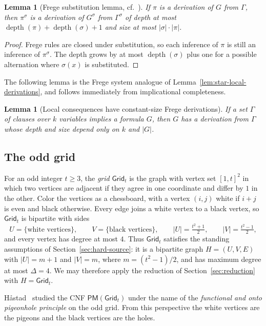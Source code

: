\documentclass[11pt]{article}
\newtheorem{lemma}[theorem]{Lemma}
\theoremstyle{definition}
\theoremstyle{remark}
\newcommand{\PM}{\mathsf{PM}}
\newcommand{\Grid}{\mathsf{Grid}}
\begin{document}
\begin{lemma}[{Frege substitution lemma, cf.~\cite[Lemma~2.5]{cook-reckhow}}]
\label{lem:frege-substitution}
If $\pi$ is a derivation of $G$ from $\Gamma$, then $\pi^\sigma$ is a derivation of $G^\sigma$ from $\Gamma^\sigma$ of depth at most $\operatorname{depth}(\pi)+\operatorname{depth}(\sigma)+1$ and size at most $|\sigma|\cdot|\pi|$.
\end{lemma}

\begin{proof}
Frege rules are closed under substitution, so each inference of $\pi$ is still an inference of $\pi^\sigma$. The depth grows by at most $\operatorname{depth}(\sigma)$ plus one for a possible alternation where $\sigma(x)$ is substituted.
\end{proof}

The following lemma is the Frege system analogue of Lemma~\ref{lem:star-local-derivations}, and follows immediately from implicational completeness.

\begin{lemma}[Local consequences have constant-size Frege derivations]
\label{lem:frege-local-derivations}
If a set $\Gamma$ of clauses over $k$ variables implies a formula $G$, then $G$ has a derivation from $\Gamma$ whose depth and size depend only on $k$ and $|G|$.
\end{lemma}

\subsection{The odd grid}
\label{sec:grid}

For an odd integer $t\ge3$, the \emph{grid} $\Grid_t$ is the graph with vertex set $[1,t]^2$ in which two vertices are adjacent if they agree in one coordinate and differ by $1$ in the other. Color the vertices as a chessboard, with a vertex $(i,j)$ white if $i+j$ is even and black otherwise. Every edge joins a white vertex to a black vertex, so $\Grid_t$ is bipartite with sides
\[
U=\{\text{white vertices}\},\qquad V=\{\text{black vertices}\},\qquad |U|=\tfrac{t^2+1}{2},\qquad |V|=\tfrac{t^2-1}{2},
\]
and every vertex has degree at most $4$. Thus $\Grid_t$ satisfies the standing assumptions of Section~\ref{sec:hard-source}: it is a bipartite graph $H=(U,V,E)$ with $|U|=m+1$ and $|V|=m$, where $m=(t^2-1)/2$, and has maximum degree at most $\Delta=4$. We may therefore apply the reduction of Section~\ref{sec:reduction} with $H=\Grid_t$.

H\r{a}stad~\cite{hastad-php} studied the CNF $\PM(\Grid_t)$ under the name of the \emph{functional and onto pigeonhole principle} on the odd grid. From this perspective the white vertices are the pigeons and the black vertices are the holes.
\end{document}
